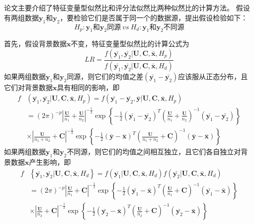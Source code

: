 \documentclass[12pt,a4paper]{article}
\begin{document}
    \section{}
    \vspace{10pt}
    论文主要介绍了特征变量型似然比和评分法似然比两种似然比的计算方法。
    假设有两组数据$\bm{y}_1$和$\bm{y}_2$，要检验它们是否属于同一个的数据源，提出假设检验如下：
    \begin{equation}
        H_p: \bm{y}_1\text{和}\bm{y}_2\text{同源}\ vs\ H_d: \bm{y}_1\text{和}\bm{y}_2\text{不同源}
    \end{equation}\par
    首先，假设背景数据$\bm{x}$不变，特征变量型似然比的计算公式为
    \begin{equation}
        LR = \frac{f\left(\bar{\bm{y}_1},\bar{\bm{y}_2}|\bm{U},\bm{C},\bar{\bm{x}},H_p\right)}{f\left(\bar{\bm{y}_1},\bar{\bm{y}_2}|\bm{U},\bm{C},\bar{\bm{x}},H_d\right)}
    \end{equation}
    如果两组数据$\bm{y}_1$和$\bm{y}_2$同源，则它们的均值之差$(\bar{\bm{y}_1}-\bar{\bm{y}_2})$应该服从正态分布，且它们对背景数据$\bm{x}$具有相同的影响，即
    \begin{equation}
        \begin{split}
            f&\left(\bar{\bm{y}_1},\bar{\bm{y}_2}|\bm{U},\bm{C},\bar{\bm{x}},H_p\right)=f\left(\bar{\bm{y}_1}-\bar{\bm{y}_2},\bar{\bm{y}}|\bm{U},\bm{C},\bar{\bm{x}},H_p\right)\\
                &=\left(2\pi\right)^{-p}\left|\frac{\bm{U}}{n_1}+\frac{\bm{U}}{n_2}\right|^{-\frac{1}{2}}\exp\left\{-\frac{1}{2}\left(\bar{\bm{y}_1}-\bar{\bm{y}_2}\right)^T\left(\frac{\bm{U}}{n_1}+\frac{\bm{U}}{n_2}\right)^{-1}\left(\bar{\bm{y}_1}-\bar{\bm{y}_2}\right)\right\}\\
                &\times\left|\frac{\bm{U}}{n_1+n_2}+\bm{C}\right|^{-\frac{1}{2}}\exp\left\{-\frac{1}{2}\left(\bar{\bm{y}}-\bar{\bm{x}}\right)^T\left(\frac{\bm{U}}{n_1+n_2}+\bm{C}\right)^{-1}\left(\bar{\bm{y}}-\bar{\bm{x}}\right)\right\}
        \end{split}
    \end{equation}
    如果两组数据$\bm{y}_1$和$\bm{y}_2$不同源，则它们的均值之间相互独立，且它们各自独立对背景数据$\bm{x}$产生影响，即
    \begin{equation}
        \begin{split}
            f&\left\{\bar{\bm{y}_1},\bar{\bm{y}_2}|\bm{U},\bm{C},\bar{\bm{x}},H_d\right\}=f\left(\bar{\bm{y}_1}|\bm{U},\bm{C},\bar{\bm{x}},H_d\right)f\left(\bar{\bm{y}_2}|\bm{U},\bm{C},\bar{\bm{x}},H_d\right)\\
                &=\left(2\pi\right)^{-p}\left|\frac{\bm{U}}{n_1}+\bm{C}\right|^{-\frac{1}{2}}\exp\left\{-\frac{1}{2}\left(\bar{\bm{y}_1}-\bar{\bm{x}}\right)^T\left(\frac{\bm{U}}{n_1}+\bm{C}\right)^{-1}\left(\bar{\bm{y}_1}-\bar{\bm{x}}\right)\right\}\\
                &\times\left|\frac{\bm{U}}{n_2}+\bm{C}\right|^{-\frac{1}{2}}\exp\left\{-\frac{1}{2}\left(\bar{\bm{y}_2}-\bar{\bm{x}}\right)^T\left(\frac{\bm{U}}{n_2}+\bm{C}\right)^{-1}\left(\bar{\bm{y}_2}-\bar{\bm{x}}\right)\right\}
        \end{split}
    \end{equation}
\end{document}
